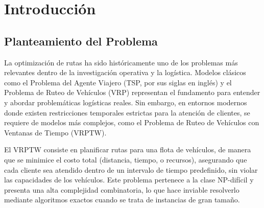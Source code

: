 \documentclass[12pt,titlepage,twoside,openright]{book}
\makeatletter
\def\cleardoublepage{\clearpage\if@twoside \ifodd\c@page\else
\hbox{}
\thispagestyle{empty}
\newpage
\if@twocolumn\hbox{}\newpage\fi\fi\fi}
\makeatother
\begin{document}

\setcounter{tocdepth}{3}
\setcounter{secnumdepth}{3}


\tableofcontents
\cleardoublepage
\listoffigures
{}
\cleardoublepage
\listoftables
{}
\cleardoublepage
\listofmyequations
{}
\cleardoublepage


\mainmatter
\pagestyle{fancy}
\fancyhf{}
\fancyhead[RO,LE]{\bfseries \thepage}
\fancyhead[LO]{\nouppercase{\rightmark}}
\fancyhead[RE]{\nouppercase{\leftmark}}
\fancyfoot{}

\setlength{\parindent}{0pt}
\setlength{\parskip}{1.5ex}

\newcommand{\tab}{\hspace*{1cm}}

\chapter{Introducción}
\label{cap:introduccion}

\section{Planteamiento del Problema}

La optimización de rutas ha sido históricamente uno de los problemas más relevantes dentro de la investigación operativa y la logística. Modelos clásicos como el Problema del Agente Viajero (TSP, por sus siglas en inglés) y el Problema de Ruteo de Vehículos (VRP) representan el fundamento para entender y abordar problemáticas logísticas reales. Sin embargo, en entornos modernos donde existen restricciones temporales estrictas para la atención de clientes, se requiere de modelos más complejos, como el Problema de Ruteo de Vehículos con Ventanas de Tiempo (VRPTW).

El VRPTW consiste en planificar rutas para una flota de vehículos, de manera que se minimice el costo total (distancia, tiempo, o recursos), asegurando que cada cliente sea atendido dentro de un intervalo de tiempo predefinido, sin violar las capacidades de los vehículos. Este problema pertenece a la clase NP-difícil y presenta una alta complejidad combinatoria, lo que hace inviable resolverlo mediante algoritmos exactos cuando se trata de instancias de gran tamaño.
\end{document}
